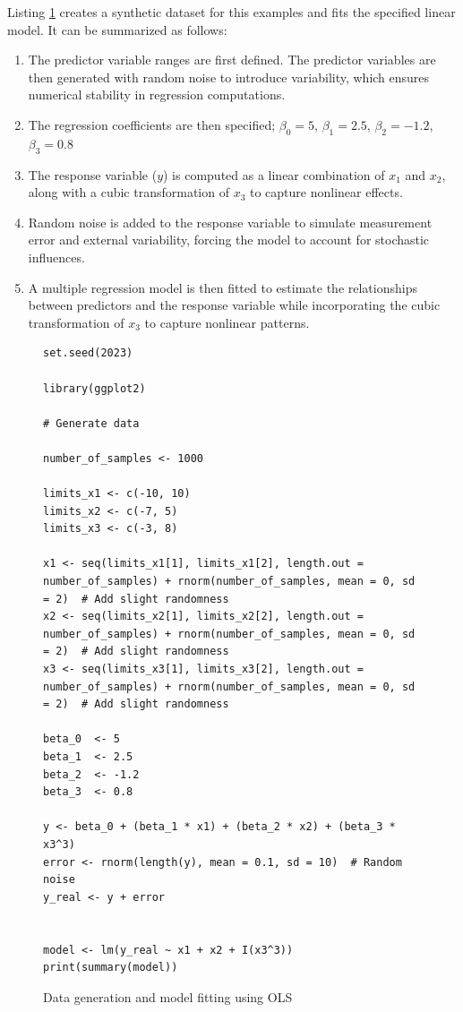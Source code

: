 \documentclass[]{article}
\begin{document}
Listing \ref{lst:ols} creates a synthetic dataset for this examples and fits the specified linear model. It can be summarized as follows:

\begin{enumerate}
	\item The predictor variable ranges are first defined. The predictor variables are then generated with random noise to introduce variability, which ensures numerical stability in regression computations.  
	
	\item The regression coefficients are then specified; $\beta_0 = 5$, $\beta_1 = 2.5$, $\beta_2 = -1.2$, $\beta_3 = 0.8$
	
	\item The response variable ($y$) is computed as a linear combination of $x_1$ and $x_2$, along with a cubic transformation of $x_3$ to capture nonlinear effects.  
	
	\item Random noise is added to the response variable to simulate measurement error and external variability, forcing the model to account for stochastic influences.  
	
	\item A multiple regression model is then fitted to estimate the relationships between predictors and the response variable while incorporating the cubic transformation of $x_3$ to capture nonlinear patterns.  
\end{enumerate}


\begin{figure}[H]
	\captionsetup{type=lstlisting}
	\begin{lstlisting}
set.seed(2023)

library(ggplot2)

# Generate data

number_of_samples <- 1000

limits_x1 <- c(-10, 10)
limits_x2 <- c(-7, 5)
limits_x3 <- c(-3, 8)

x1 <- seq(limits_x1[1], limits_x1[2], length.out = number_of_samples) + rnorm(number_of_samples, mean = 0, sd = 2)  # Add slight randomness
x2 <- seq(limits_x2[1], limits_x2[2], length.out = number_of_samples) + rnorm(number_of_samples, mean = 0, sd = 2)  # Add slight randomness
x3 <- seq(limits_x3[1], limits_x3[2], length.out = number_of_samples) + rnorm(number_of_samples, mean = 0, sd = 2)  # Add slight randomness

beta_0  <- 5
beta_1  <- 2.5
beta_2  <- -1.2
beta_3  <- 0.8

y <- beta_0 + (beta_1 * x1) + (beta_2 * x2) + (beta_3 * x3^3)
error <- rnorm(length(y), mean = 0.1, sd = 10)  # Random noise
y_real <- y + error


model <- lm(y_real ~ x1 + x2 + I(x3^3))
print(summary(model))			
		\end{lstlisting}
	\caption{Data generation and model fitting using OLS}
	\label{lst:ols}
\end{figure}
\end{document}
